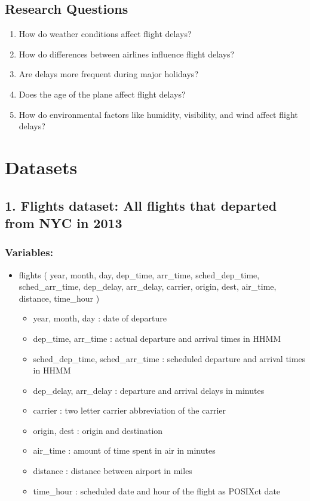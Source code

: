 \documentclass[
]{article}
\providecommand{\tightlist}{%
  \setlength{\itemsep}{0pt}\setlength{\parskip}{0pt}}
\begin{document}
\subsection{Research Questions}\label{research-questions}

\begin{enumerate}
\def\labelenumi{\arabic{enumi}.}
\tightlist
\item
  How do weather conditions affect flight delays?
\item
  How do differences between airlines influence flight delays?
\item
  Are delays more frequent during major holidays?
\item
  Does the age of the plane affect flight delays?
\item
  How do environmental factors like humidity, visibility, and wind
  affect flight delays?
\end{enumerate}

\section{Datasets}\label{datasets}

\subsection{1. Flights dataset: All flights that departed from NYC in
2013}\label{flights-dataset-all-flights-that-departed-from-nyc-in-2013}

\subsubsection{Variables:}\label{variables}

\begin{itemize}
\tightlist
\item
  flights ( year, month, day, dep\_time, arr\_time, sched\_dep\_time,
  sched\_arr\_time, dep\_delay, arr\_delay, carrier, origin, dest,
  air\_time, distance, time\_hour )

  \begin{itemize}
  \tightlist
  \item
    year, month, day : date of departure
  \item
    dep\_time, arr\_time : actual departure and arrival times in HHMM
  \item
    sched\_dep\_time, sched\_arr\_time : scheduled departure and arrival
    times in HHMM
  \item
    dep\_delay, arr\_delay : departure and arrival delays in minutes
  \item
    carrier : two letter carrier abbreviation of the carrier
  \item
    origin, dest : origin and destination
  \item
    air\_time : amount of time spent in air in minutes
  \item
    distance : distance between airport in miles
  \item
    time\_hour : scheduled date and hour of the flight as POSIXct date
  \end{itemize}
\end{itemize}
\end{document}
